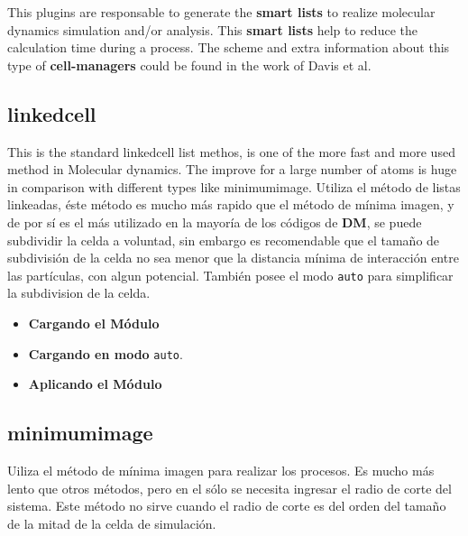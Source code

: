 This plugins are responsable to generate the \textbf{smart lists} to realize
molecular dynamics simulation and/or analysis. This \textbf{smart lists} help
to reduce the calculation time during a process. The scheme and extra
information about this type of \textbf{cell-managers} could be found in the
work of Davis et al.

\subsection{linkedcell}

This is the standard linkedcell list methos, is one of the more fast and more
used method in Molecular dynamics. The improve for a large number of atoms is
huge in comparison with different types like minimumimage.
Utiliza el m\'etodo de listas linkeadas, \'este m\'etodo es mucho m\'as rapido
que el m\'etodo de m\'inima imagen, y de por s\'i es el m\'as utilizado en la
mayor\'ia de los c\'odigos de \textbf{DM}, se puede subdividir la celda a
voluntad, sin embargo es recomendable que el tama\~no de subdivisi\'on de la
celda no sea menor que la distancia m\'inima de interacci\'on entre las
part\'iculas, con algun potencial. Tambi\'en posee el modo \verb|auto| para
simplificar la subdivision de la celda.

\begin{itemize}
 \item \textbf{Cargando el M\'odulo}
 \item \textbf{Cargando en modo} \texttt{auto}.
 \item \textbf{Aplicando el M\'odulo}
\end{itemize}

\subsection{minimumimage}
Uiliza el m\'etodo de m\'inima imagen para realizar los procesos. Es mucho m\'as
lento que otros m\'etodos, pero en el s\'olo se necesita ingresar el radio de
corte del sistema. Este m\'etodo no sirve cuando el radio de corte es del orden
del tama\~no de la mitad de la celda de simulaci\'on.

